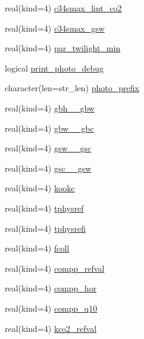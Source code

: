 \begin{DoxyCompactItemize}
\item 
real(kind=4) \hyperlink{namespacephysiology__coms_a62fb9fb182c231b4376b0b879ff34699}{c34smax\+\_\+lint\+\_\+co2}
\item 
real(kind=4) \hyperlink{namespacephysiology__coms_af33f3bc89a2177f836b4ae9013e35bef}{c34smax\+\_\+gsw}
\item 
real(kind=4) \hyperlink{namespacephysiology__coms_a1c3d183c463f09e3e18b16a2bac5c887}{par\+\_\+twilight\+\_\+min}
\item 
logical \hyperlink{namespacephysiology__coms_afdf6c3084ba85f92a6ac66ac88ec7591}{print\+\_\+photo\+\_\+debug}
\item 
character(len=str\+\_\+len) \hyperlink{namespacephysiology__coms_a2c980690ad445a3f111aded7d288008c}{photo\+\_\+prefix}
\item 
real(kind=4) \hyperlink{namespacephysiology__coms_aa4949b861f6e1bce2fc1e5967a92724f}{gbh\+\_\+\_\+gbw}
\item 
real(kind=4) \hyperlink{namespacephysiology__coms_adfbb266baf2d2adc77509b82f4271ac8}{gbw\+\_\+\_\+gbc}
\item 
real(kind=4) \hyperlink{namespacephysiology__coms_adf37725d15d69bf28dee128f9712dd62}{gsw\+\_\+\_\+gsc}
\item 
real(kind=4) \hyperlink{namespacephysiology__coms_a2d716763934e1b78fb7be2d3080663c6}{gsc\+\_\+\_\+gsw}
\item 
real(kind=4) \hyperlink{namespacephysiology__coms_a141a8141098b73d902febd2617e1eb35}{kookc}
\item 
real(kind=4) \hyperlink{namespacephysiology__coms_a1ddecfcd801722fae0a28e4495a8b58f}{tphysref}
\item 
real(kind=4) \hyperlink{namespacephysiology__coms_a2ab9832e0895c53fecec95dd004f9a6c}{tphysrefi}
\item 
real(kind=4) \hyperlink{namespacephysiology__coms_a27a1df432bb5efa255a5dc1eb52539ec}{fcoll}
\item 
real(kind=4) \hyperlink{namespacephysiology__coms_a040ae8708ee3f595e037d5ecd862b9cb}{compp\+\_\+refval}
\item 
real(kind=4) \hyperlink{namespacephysiology__coms_a95a3966dda3b047ea282410207b0fd19}{compp\+\_\+hor}
\item 
real(kind=4) \hyperlink{namespacephysiology__coms_aae7373d82d49b0ce76e9a3261df920ea}{compp\+\_\+q10}
\item 
real(kind=4) \hyperlink{namespacephysiology__coms_ae8c6d3c5ceb1841e173110fb665913f3}{kco2\+\_\+refval}
\item 

\end{DoxyCompactItemize}
